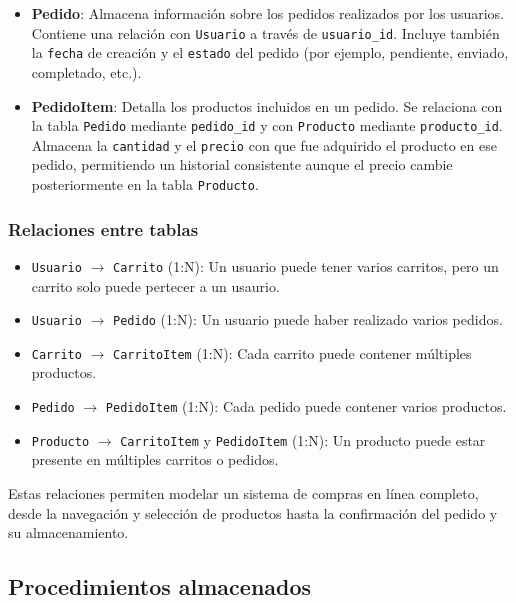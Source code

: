 \documentclass[10pt]{book}
\begin{document}
\begin{itemize}
        \item \textbf{Pedido}: Almacena información sobre los pedidos realizados por los usuarios. Contiene una relación con \texttt{Usuario} a través de \texttt{usuario\_id}. Incluye también la \texttt{fecha} de creación y el \texttt{estado} del pedido (por ejemplo, pendiente, enviado, completado, etc.).
        
        \item \textbf{PedidoItem}: Detalla los productos incluidos en un pedido. Se relaciona con la tabla \texttt{Pedido} mediante \texttt{pedido\_id} y con \texttt{Producto} mediante \texttt{producto\_id}. Almacena la \texttt{cantidad} y el \texttt{precio} con que fue adquirido el producto en ese pedido, permitiendo un historial consistente aunque el precio cambie posteriormente en la tabla \texttt{Producto}.
    \end{itemize}
    
    \subsubsection*{Relaciones entre tablas}
    
    \begin{itemize}
        \item \texttt{Usuario} $\rightarrow$ \texttt{Carrito} (1:N): Un usuario puede tener varios carritos, pero un carrito solo puede pertecer a un usaurio.
        \item \texttt{Usuario} $\rightarrow$ \texttt{Pedido} (1:N): Un usuario puede haber realizado varios pedidos.
        \item \texttt{Carrito} $\rightarrow$ \texttt{CarritoItem} (1:N): Cada carrito puede contener múltiples productos.
        \item \texttt{Pedido} $\rightarrow$ \texttt{PedidoItem} (1:N): Cada pedido puede contener varios productos.
        \item \texttt{Producto} $\rightarrow$ \texttt{CarritoItem} y \texttt{PedidoItem} (1:N): Un producto puede estar presente en múltiples carritos o pedidos.
    \end{itemize}
    
    Estas relaciones permiten modelar un sistema de compras en línea completo, desde la navegación y selección de productos hasta la confirmación del pedido y su almacenamiento.
    
\subsection{Procedimientos almacenados}
\end{document}
